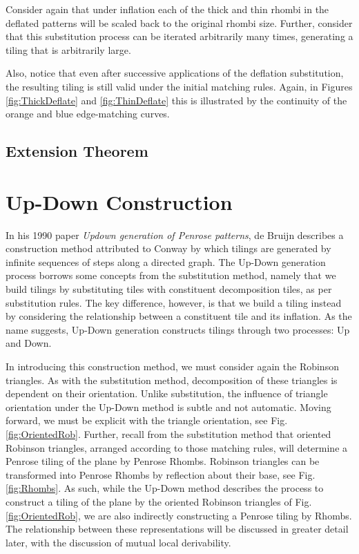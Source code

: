 \documentclass[
  oneside,
  11pt, a4paper,
  footinclude=true,
  headinclude=true,
  cleardoublepage=empty
]{scrbook}
\begin{document}
Consider again that under inflation each of the thick and thin rhombi in the deflated patterns will be scaled back to the original rhombi size. Further, consider that this substitution process can be iterated arbitrarily many times, generating a tiling that is arbitrarily large. 

Also, notice that even after successive applications of the deflation substitution, the resulting tiling is still valid under the initial matching rules. Again, in Figures \ref{fig:ThickDeflate} and \ref{fig:ThinDeflate} this is illustrated by the continuity of the orange and blue edge-matching curves.

\subsection{Extension Theorem}

\section{Up-Down Construction}

In his 1990 paper \textit{Updown generation of Penrose patterns}, de Bruijn describes a construction method attributed to Conway by which tilings are generated by infinite sequences of steps along a directed graph. The Up-Down generation process borrows some concepts from the substitution method, namely that we build tilings by substituting tiles with constituent decomposition tiles, as per substitution rules. The key difference, however, is that we build a tiling instead by considering the relationship between a constituent tile and its inflation. As the name suggests, Up-Down generation constructs tilings through two processes: Up and Down.

In introducing this construction method, we must consider again the Robinson triangles. As with the substitution method, decomposition of these triangles is dependent on their orientation. Unlike substitution, the influence of triangle orientation under the Up-Down method is subtle and not automatic. Moving forward, we must be explicit with the triangle orientation, see Fig.\ref{fig:OrientedRob}. Further, recall from the substitution method that oriented Robinson triangles, arranged according to those matching rules, will determine a Penrose tiling of the plane by Penrose Rhombs. Robinson triangles can be transformed into Penrose Rhombs by reflection about their base, see Fig.\ref{fig:Rhombs}. As such, while the Up-Down method describes the process to construct a tiling of the plane by the oriented Robinson triangles of Fig.\ref{fig:OrientedRob}, we are also indirectly constructing a Penrose tiling by Rhombs. The relationship between these representations will be discussed in greater detail later, with the discussion of mutual local derivability. 
\end{document}

